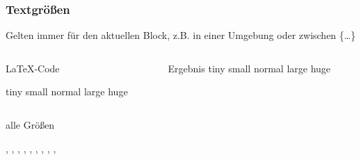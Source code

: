 \begin{frame}[fragile]
    \frametitle{Textgrößen}
    Gelten immer für den aktuellen Block, z.B. in einer Umgebung oder zwischen \{\dots\}
    \begin{columns}[t]
        \begin{column}{0.47\textwidth}
            \begin{block}{\LaTeX-Code}
            \begin{lstverbatim}
                {\tiny tiny }
                {\small small}
                {\normalsize normal}
                {\large large}
                {\huge huge}
            \end{lstverbatim}
            \end{block}
        \end{column}
        \begin{column}{0.47\textwidth}
            \begin{block}{Ergebnis}
                {\tiny tiny }
                {\small small}
                {\normalsize normal}
                {\large large}
                {\huge huge}
            \end{block}
        \end{column}
    \end{columns}
    \vspace{1em}
    \begin{block}{alle Größen}
        \begin{lstverbatim}
        \tiny, \scriptsize, \footnotesize, \small, \normalsize, \large, \Large, \LARGE, \huge, \Huge
        \end{lstverbatim}
    \end{block}
\end{frame}
